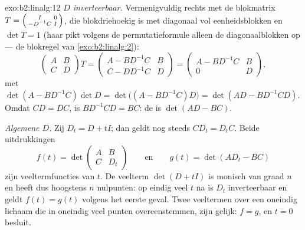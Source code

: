 \begin{solution}{exo:b2:linalg:12}
\emph{$D$ inverteerbaar.} Vermenigvuldig rechts met de blokmatrix
$T = \begin{psmallmatrix} I & 0\\ -D^{-1}C & I\end{psmallmatrix}$,
die blokdriehoekig is met diagonaal vol eenheidsblokken en $\det T
= 1$ (haar  pikt volgens de permutatieformule alleen de
diagonaalblokken op --- de blokregel van \cref{exo:b2:linalg:2}):
\[
\begin{pmatrix} A & B\\ C & D\end{pmatrix} T
= \begin{pmatrix} A - BD^{-1}C & B\\ C - DD^{-1}C & D\end{pmatrix}
= \begin{pmatrix} A - BD^{-1}C & B\\ 0 & D\end{pmatrix},
\]
met  $\det(A - BD^{-1}C)\det D = \det\bigl((A -
BD^{-1}C)D\bigr) = \det(AD - BD^{-1}CD)$. Omdat $CD = DC$, is
$BD^{-1}CD = BC$: de  is $\det(AD - BC)$.

\emph{Algemene $D$.} Zij $D_t = D + tI$; dan geldt nog steeds
$CD_t = D_tC$. Beide uitdrukkingen
\[
f(t) = \det\begin{pmatrix} A & B\\ C & D_t\end{pmatrix}
\qquad\text{en}\qquad
g(t) = \det(AD_t - BC)
\]
zijn veeltermfuncties van $t$. De veelterm $\det(D + tI)$ is
monisch van graad $n$ en heeft dus hoogstens $n$ nulpunten: op
eindig veel $t$ na is $D_t$ inverteerbaar en geldt $f(t) = g(t)$
volgens het eerste geval. Twee veeltermen over een oneindig
lichaam die in oneindig veel punten overeenstemmen, zijn gelijk:
$f = g$, en $t = 0$ besluit.
\end{solution}

